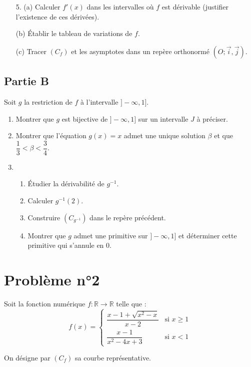 \documentclass[12pt]{article}
\begin{document}
\begin{enumerate}
    \item[5.] (a) Calculer \( f'(x) \) dans les intervalles où \( f \) est dérivable (justifier l’existence de ces dérivées).
    \item[(b)] Établir le tableau de variations de \( f \).
    \item[(c)] Tracer \( (C_f) \) et les asymptotes dans un repère orthonormé \( (O; \vec{i}, \vec{j}) \).
\end{enumerate}
\subsection*{Partie B}

Soit \( g \) la restriction de \( f \) à l’intervalle \( ] -\infty, 1] \).

\begin{enumerate}
    \item Montrer que \( g \) est bijective de \( ] -\infty, 1] \) sur un intervalle \( J \) à préciser.
    \item Montrer que l’équation \( g(x) = x \) admet une unique solution \( \beta \) et que \( \dfrac{1}{3} < \beta < \dfrac{3}{4} \).
    \item 
    \begin{enumerate}
        \item Étudier la dérivabilité de \( g^{-1} \).
        \item Calculer \( g^{-1}(2) \).
        \item Construire \( (C_{g^{-1}}) \) dans le repère précédent.
        \item Montrer que \( g \) admet une primitive sur \( ] -\infty, 1] \) et déterminer cette primitive qui s’annule en 0.
    \end{enumerate}
\end{enumerate}
\section*{Problème n°2}

Soit la fonction numérique \( f : \mathbb{R} \to \mathbb{R} \) telle que :
\[
f(x) = 
\begin{cases} 
\dfrac{x - 1 + \sqrt{x^2 - x}}{x - 2} & \text{si } x \geq 1 \\
\dfrac{x - 1}{x^2 - 4x + 3} & \text{si } x < 1 
\end{cases}
\]

On désigne par \( (C_f) \) sa courbe représentative.
\end{document}
